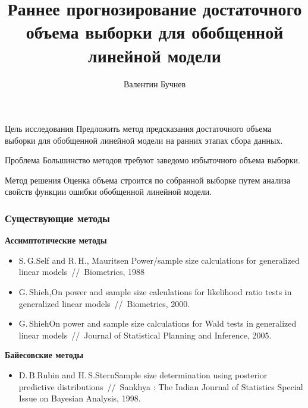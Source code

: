 \documentclass{beamer}
\title[\hbox to 56mm{Достаточный объем выборки  \hfill\insertframenumber\,/\,\inserttotalframenumber}]
{Раннее прогнозирование достаточного объема выборки для обобщенной линейной модели}
\author[В.\,С.~Бучнев]{Валентин Бучнев}
\institute{Московский физико-технический институт}
\date{\footnotesize{
группа 694, 2020
\date{qq}
}}
\begin{document}
\begin{frame}
\titlepage %
\end{frame}

\begin{frame}
\begin{block}{Цель исследования}
Предложить метод предсказания достаточного объема выборки для обобщенной линейной модели на ранних этапах сбора данных.
\end{block}
\begin{block}{Проблема}
Большинство методов требуют заведомо избыточного объема выборки.
\end{block}
\begin{block}{Метод решения}
Оценка объема строится по собранной выборке путем анализа свойств функции ошибки обобщенной линейной модели.
\end{block}

\end{frame}

\begin{frame}
\frametitle{Существующие методы}

\textbf{Ассимптотические методы}

\begin{itemize}
  \item S.\,G.\;Self and R.\,H.,\; Mauritsen Power/sample size calculations for generalized linear
models~//~Biometrics, 1988
  \item G.\,Shieh,\;On power and sample size calculations for likelihood ratio tests in generalized linear models~//~Biometrics, 2000.
  \item G.\,Shieh\;On power and sample size calculations for Wald tests in generalized linear models~//~Journal of Statistical Planning and Inference, 2005.
\end{itemize}

\textbf{Байесовские методы}

\begin{itemize}
  \item D.\,B.\;Rubin and H.\,S.\;Stern\;Sample size determination using posterior predictive distributions~//~Sankhya : The Indian Journal of Statistics Special Issue on Bayesian Analysis, 1998.
\end{itemize}

\end{frame}
\end{document}
